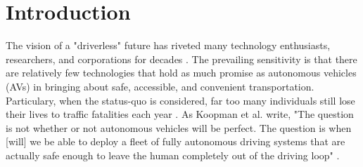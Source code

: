 \documentclass[manuscript,screen,review]{acmart}
\newcommand{\todo}[1]{\textcolor{red}{\textbf{\underline{TODO:}} #1}}
\begin{document}





\maketitle

\section{Introduction}


The vision of a "driverless" future has riveted many technology enthusiasts, researchers, and corporations for decades \cite{Badue2019}. The prevailing sensitivity is that there are relatively few technologies that hold as much promise as autonomous vehicles (AVs) in bringing about safe, accessible, and convenient transportation. Particulary, when the status-quo is considered, far too many individuals still lose their lives to traffic fatalities each year \cite{Rasouli2020}. As Koopman et al. write, "The question is not whether or not autonomous vehicles will be perfect. The question is when [will] we be able to deploy a fleet of fully autonomous driving systems that are actually safe enough to leave the human completely out of the driving loop" \cite{Koopman2017}. 
\end{document}
